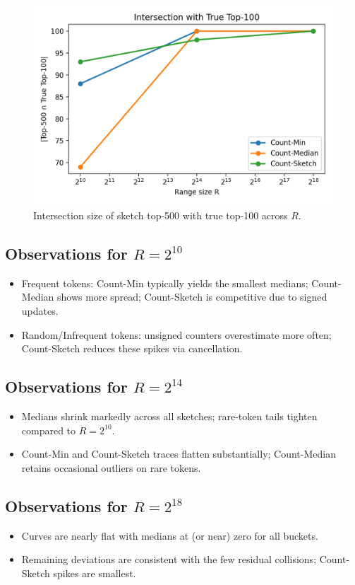 \documentclass[11pt]{article}
\begin{document}
\begin{figure}[H]
  \centering
  \includegraphics[width=0.55\linewidth]{../outputs/a2/top500_intersection.png}
  \caption{Intersection size of sketch top-500 with true top-100 across $R$.}
  \label{fig:top500}
\end{figure}

\subsection*{Observations for $R=2^{10}$}
\begin{itemize}
  \item Frequent tokens: Count-Min typically yields the smallest medians; Count-Median shows more spread; Count-Sketch is competitive due to signed updates.
  \item Random/Infrequent tokens: unsigned counters overestimate more often; Count-Sketch reduces these spikes via cancellation.
\end{itemize}

\subsection*{Observations for $R=2^{14}$}
\begin{itemize}
  \item Medians shrink markedly across all sketches; rare-token tails tighten compared to $R=2^{10}$.
  \item Count-Min and Count-Sketch traces flatten substantially; Count-Median retains occasional outliers on rare tokens.
\end{itemize}

\subsection*{Observations for $R=2^{18}$}
\begin{itemize}
  \item Curves are nearly flat with medians at (or near) zero for all buckets.
  \item Remaining deviations are consistent with the few residual collisions; Count-Sketch spikes are smallest.
\end{itemize}
\end{document}
